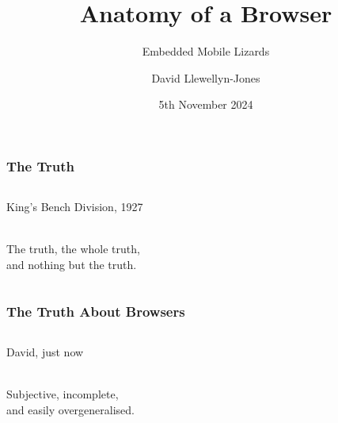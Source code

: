 \documentclass[
	notes=none,
	aspectratio=169
]{beamer}
\begin{document}
\title{Anatomy of a Browser}
\subtitle{Embedded Mobile Lizards}
\author{David Llewellyn-Jones}
\date{5th November 2024}


\renewcommand{\thefootnote}{\arabic{footnote}}

\frame{
\titlepage
}
\note{
}

\renewcommand{\thefootnote}{\fnsymbol{footnote}}


\begin{frame}
\frametitle{The Truth}

\begin{columns}[T]
\begin{column}[T]{0.7\textwidth}
\setlength{\parskip}{0.5em}

\vspace{0.5cm}

\begin{shadequote}[r]{King's Bench Division, 1927}
\vspace{-0.3cm} \raggedright \\
{\huge \vphantom{Og}The truth, the whole truth, \\and nothing but the truth.} \\
\vspace{0.3cm}
\end{shadequote}

\end{column}
\end{columns}

\end{frame}
\note{
}


\begin{frame}
\frametitle{The Truth About Browsers}

\begin{columns}[T]
\begin{column}[T]{0.7\textwidth}
\setlength{\parskip}{0.5em}

\vspace{0.5cm}

\begin{shadequote}[r]{David, just now}
\vspace{-0.3cm} \raggedright \\
{\huge Subjective, incomplete, \\and easily overgeneralised.} \\
\vspace{0.3cm}
\end{shadequote}

\end{column}
\end{columns}

\end{frame}
\note{
}
\end{document}

